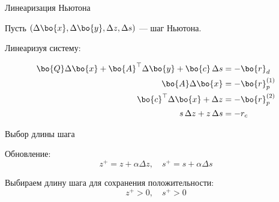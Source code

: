 \documentclass{beamer}
\begin{document}
\begin{frame}{Линеаризация Ньютона}
	\begin{flushleft}
		
		Пусть $(\Delta \bo{x}, \Delta \bo{y}, \Delta z, \Delta s)$ — шаг Ньютона.
		
		\vspace{0.5em}
		
		Линеаризуя систему:
		
		\vspace{0.5em}
		
		\begin{align*}
			\bo{Q} \Delta \bo{x} + \bo{A}^\top \Delta \bo{y} + \bo{c} \, \Delta s &= -\bo{r}_d \\
			\bo{A} \Delta \bo{x} &= -\bo{r}_p^{(1)} \\
			\bo{c}^\top \Delta \bo{x} + \Delta z &= -\bo{r}_p^{(2)} \\
			s \, \Delta z + z \, \Delta s &= -r_c
		\end{align*}
		
	\end{flushleft}
\end{frame}

\begin{frame}{Выбор длины шага}
	\begin{flushleft}
		
		Обновление:
		\[
		z^+ = z + \alpha \Delta z, \quad s^+ = s + \alpha \Delta s
		\]
		
		\vspace{0.5em}
		
		Выбираем длину шага для сохранения положительности:
		\[
		z^+ > 0, \quad s^+ > 0
		\]
		
	\end{flushleft}
\end{frame}
\end{document}
